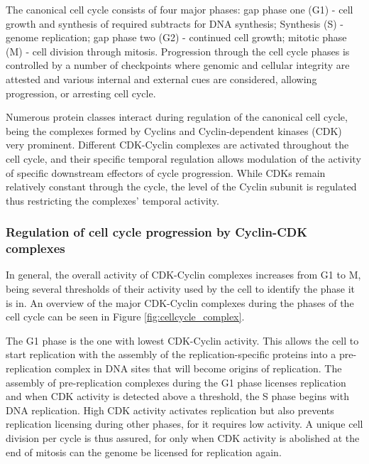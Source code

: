 \documentclass[11pt,twoside,a4paper]{report}
\begin{document}
			The canonical cell cycle consists of four major phases: gap phase one (G1) - cell growth and synthesis of required subtracts for DNA synthesis; Synthesis (S) - genome replication; gap phase two (G2) - continued cell growth; mitotic phase (M) - cell division through mitosis. Progression through the cell cycle phases is controlled by a number of checkpoints where genomic and cellular integrity are attested and various internal and external cues are considered, allowing progression, or arresting cell cycle.
			
			Numerous protein classes interact during regulation of the canonical cell cycle, being the complexes formed by Cyclins and Cyclin-dependent kinases (CDK) very prominent. Different CDK-Cyclin complexes are activated throughout the cell cycle, and their specific temporal regulation allows modulation of the activity of specific downstream effectors of cycle progression. While CDKs remain relatively constant through the cycle, the level of the Cyclin subunit is regulated thus restricting the complexes' temporal activity. 
			
				\subsubsection{Regulation of cell cycle progression by Cyclin-CDK complexes}
				In general, the overall activity of CDK-Cyclin complexes increases from G1 to M, being several thresholds of their activity used by the cell to identify the phase it is in. An overview of the major CDK-Cyclin complexes during the phases of the cell cycle can be seen in Figure \ref{fig:cellcycle_complex}.
				
								
				The G1 phase is the one with lowest CDK-Cyclin activity. This allows the cell to start replication with the assembly of the replication-specific proteins into a pre-replication complex in DNA sites that will become origins of replication. The assembly of pre-replication complexes during the G1 phase licenses replication and when CDK activity is detected above a threshold, the S phase begins with DNA replication. High CDK activity activates replication but also prevents replication licensing during other phases, for it requires low activity. A unique cell division per cycle is thus assured, for only when CDK activity is abolished at the end of mitosis can the genome be licensed for replication again.
				
\end{document}
